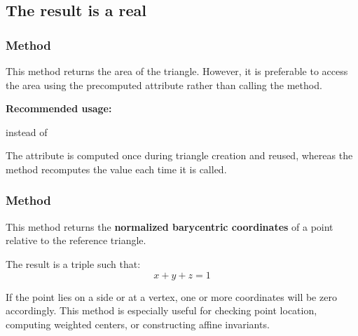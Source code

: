 


\subsection{The result is a real} %

\subsubsection{Method } %
\label{ssub:method_triangle_area}

This method returns the area of the triangle. However, it is preferable to access the area using the precomputed  attribute rather than calling the method.

\medskip
\noindent
\textbf{Recommended usage:}
\begin{mybox}
 \quad instead of \quad {}
\end{mybox}

\noindent
The attribute is computed once during triangle creation and reused, whereas the method recomputes the value each time it is called.



\subsubsection{Method } %
\label{ssub:_triangle_barycentric__coordinates_pt}

This method returns the \textbf{normalized barycentric coordinates} of a point relative to the reference triangle.

\begin{mybox}
\end{mybox}

\medskip
\noindent
The result is a triple  such that:
\[
x + y + z = 1
\]

\medskip
\noindent
If the point lies on a side or at a vertex, one or more coordinates will be zero accordingly. This method is especially useful for checking point location, computing weighted centers, or constructing affine invariants.

